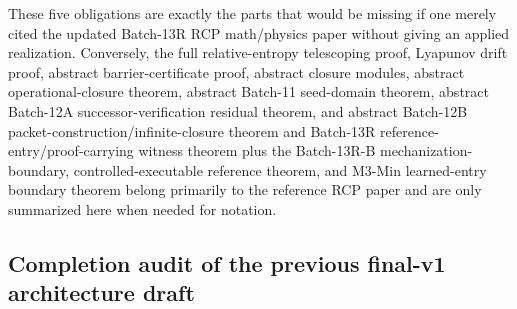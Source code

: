 \documentclass[11pt,a4paper]{article}
\begin{document}
These five obligations are exactly the parts that would be missing if one merely cited the updated Batch-13R RCP math/physics paper without giving an applied realization. Conversely, the full relative-entropy telescoping proof, Lyapunov drift proof, abstract barrier-certificate proof, abstract closure modules, abstract operational-closure theorem, abstract Batch-11 seed-domain theorem, abstract Batch-12A successor-verification residual theorem, and abstract Batch-12B packet-construction/infinite-closure theorem and Batch-13R reference-entry/proof-carrying witness theorem plus the Batch-13R-B mechanization-boundary, controlled-executable reference theorem, and M3-Min learned-entry boundary theorem belong primarily to the reference RCP paper and are only summarized here when needed for notation.


\subsection{Completion audit of the previous final-v1 architecture draft}
\end{document}
